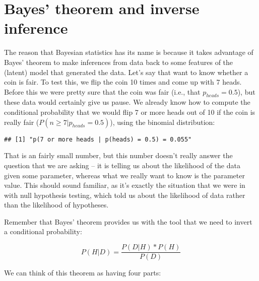\documentclass[]{book}
\newenvironment{Shaded}{\begin{snugshade}}{\end{snugshade}}
\newcommand{\KeywordTok}[1]{\textcolor[rgb]{0.13,0.29,0.53}{\textbf{#1}}}
\newcommand{\DataTypeTok}[1]{\textcolor[rgb]{0.13,0.29,0.53}{#1}}
\newcommand{\DecValTok}[1]{\textcolor[rgb]{0.00,0.00,0.81}{#1}}
\newcommand{\StringTok}[1]{\textcolor[rgb]{0.31,0.60,0.02}{#1}}
\newcommand{\CommentTok}[1]{\textcolor[rgb]{0.56,0.35,0.01}{\textit{#1}}}
\newcommand{\OtherTok}[1]{\textcolor[rgb]{0.56,0.35,0.01}{#1}}
\newcommand{\NormalTok}[1]{#1}
\theoremstyle{definition}
\theoremstyle{definition}
\theoremstyle{definition}
\theoremstyle{remark}
\begin{document}
\section{Bayes' theorem and inverse
inference}\label{bayes-theorem-and-inverse-inference}

The reason that Bayesian statistics has its name is because it takes
advantage of Bayes' theorem to make inferences from data back to some
features of the (latent) model that generated the data. Let's say that
want to know whether a coin is fair. To test this, we flip the coin 10
times and come up with 7 heads. Before this we were pretty sure that the
coin was fair (i.e., that \(p_{heads}=0.5\)), but these data would
certainly give us pause. We already know how to compute the conditional
probability that we would flip 7 or more heads out of 10 if the coin is
really fair (\(P(n\ge7|p_{heads}=0.5)\)), using the binomial
distribution:

\begin{Shaded}
\end{Shaded}

\begin{verbatim}
## [1] "p(7 or more heads | p(heads) = 0.5) = 0.055"
\end{verbatim}

That is an fairly small number, but this number doesn't really answer
the question that we are asking -- it is telling us about the likelihood
of the data given some parameter, whereas what we really want to know is
the parameter value. This should sound familiar, as it's exactly the
situation that we were in with null hypothesis testing, which told us
about the likelihood of data rather than the likelihood of hypotheses.

Remember that Bayes' theorem provides us with the tool that we need to
invert a conditional probability:

\[
P(H|D) = \frac{P(D|H)*P(H)}{P(D)}
\]

We can think of this theorem as having four parts:
\end{document}
